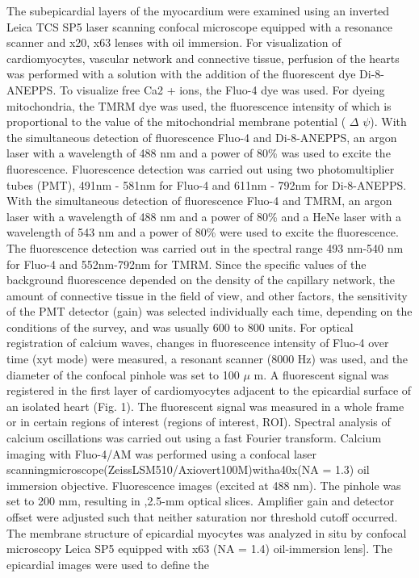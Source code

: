 \documentclass[a4paper,12pt]{article}
\begin{document}
The subepicardial layers of the myocardium were examined using an inverted Leica TCS SP5 laser scanning confocal microscope equipped with a resonance scanner and x20, x63 lenses with oil immersion.
For visualization of cardiomyocytes, vascular network and connective tissue, perfusion of the hearts was performed with a solution with the addition of the fluorescent dye Di-8-ANEPPS.
To visualize free Ca2 + ions, the Fluo-4 dye was used.
For dyeing mitochondria, the TMRM dye was used, the fluorescence intensity of which is proportional to the value of the mitochondrial membrane potential ( $\Delta$ $\psi$).
With the simultaneous detection of fluorescence Fluo-4 and Di-8-ANEPPS, an argon laser with a wavelength of 488 nm and a power of 80\% was used to excite the fluorescence.
Fluorescence detection was carried out using two photomultiplier tubes (PMT), 491nm - 581nm for Fluo-4 and 611nm - 792nm for Di-8-ANEPPS.
With the simultaneous detection of fluorescence Fluo-4 and TMRM, an argon laser with a wavelength of 488 nm and a power of 80\% and a HeNe laser with a wavelength of 543 nm and a power of 80\% were used to excite the fluorescence.
The fluorescence detection was carried out in the spectral range 493 nm-540 nm for Fluo-4 and 552nm-792nm for TMRM.
Since the specific values of the background fluorescence depended on the density of the capillary network, the amount of connective tissue in the field of view, and other factors, the sensitivity of the PMT detector (gain) was selected individually each time, depending on the conditions of the survey, and was usually 600 to 800 units.
For optical registration of calcium waves, changes in fluorescence intensity of Fluo-4 over time (xyt mode) were measured, a resonant scanner (8000 Hz) was used, and the diameter of the confocal pinhole was set to 100 $\mu$ m.
A fluorescent signal was registered in the first layer of cardiomyocytes adjacent to the epicardial surface of an isolated heart (Fig. 1). The fluorescent signal was measured in a whole frame or in certain regions of interest (regions of interest, ROI).
Spectral analysis of calcium oscillations was carried out using a fast Fourier transform.
Calcium imaging with Fluo-4/AM was performed using a confocal laser scanningmicroscope(ZeissLSM510/Axiovert100M)witha40x(NA = 1.3) oil immersion objective. Fluorescence images (excited at 488 nm).
The pinhole was set to 200 mm, resulting in ,2.5-mm optical slices. Amplifier gain and detector offset were adjusted such that neither saturation nor threshold cutoff occurred.
The membrane structure of epicardial myocytes was analyzed in situ by confocal microscopy Leica SP5 equipped with x63 (NA = 1.4) oil-immersion lens]. The epicardial images were used to define the
\end{document}
